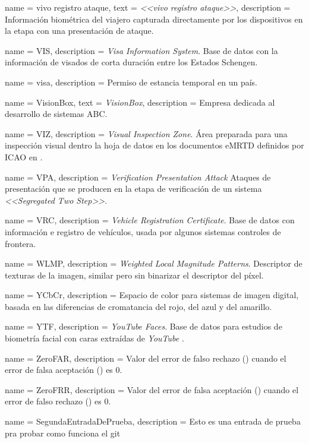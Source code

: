 {
    name        = {vivo registro ataque},
    text        = {\textit{<<vivo registro ataque>>}},
    description = {Información biométrica del viajero capturada directamente por los dispositivos  en la etapa  con una presentación de ataque.}
}

{
    name        = VIS,
    description = {\textit{Visa Information System}. Base de datos con la información de visados de corta duración entre los Estados Schengen.}
}

{
    name        = {visa},
    description = {Permiso de estancia temporal en un país.}
}

{
    name        = {VisionBox},
    text        = {\textit{VisionBox}},
    description = {Empresa dedicada al desarrollo de sistemas ABC.}
}

{
    name        = {VIZ},
    description = {\textit{Visual Inspection Zone}. Área preparada para una inspección visual dentro la hoja de datos en los documentos \gls{eMRTD} definidos por \gls{ICAO} en \cite{doc20069303}.}
}

{
    name        = {VPA},
    description = {\textit{Verification Presentation Attack} Ataques de presentación que se producen en la etapa de verificación de un sistema  \textit{<<Segregated Two Step>>}.}
}

{
    name        = {VRC},
    description = {\textit{Vehicle Registration Certificate}. Base de datos con información e registro de vehículos, usada por algunos sistemas controles de frontera.}
}

{
    name        = {WLMP},
    description = {\textit{Weighted Local Magnitude Patterns}. Descriptor de texturas de la imagen, similar  pero sin binarizar el descriptor del píxel.}
}

{
    name        = {YCbCr},
    description = {Espacio de color para sistemas de imagen digital, basada en las diferencias de cromatancia del rojo, del azul y del amarillo.}
}

{
    name        = {YTF},
    description = {\textit{YouTube Faces}. Base de datos para estudios de biometría facial con caras extraídas de \textit{YouTube} \cite{wolf2011face}.}
}

{
    name        = {ZeroFAR},
    description = {Valor del error de falso rechazo () cuando el error de falsa aceptación () es $0$.}
}

{
    name        = {ZeroFRR},
    description = {Valor del error de falsa aceptación () cuando el error de falso rechazo () es $0$.}
}

{
    name        = {SegundaEntradaDePrueba},
    description = {Esto es una entrada de prueba pra probar como funciona el git}
}
